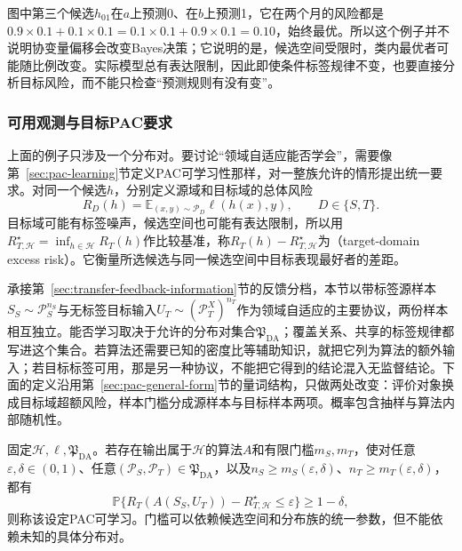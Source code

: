 图中第三个候选$h_{01}$在$a$上预测0、在$b$上预测1，它在两个月的风险都是$0.9\times0.1+0.1\times0.1=0.1\times0.1+0.9\times0.1=0.10$，始终最优。所以这个例子并不说明协变量偏移会改变Bayes决策；它说明的是，候选空间受限时，类内最优者可能随比例改变。实际模型总有表达限制，因此即使条件标签规律不变，也要直接分析目标风险，而不能只检查“预测规则有没有变”。

\subsubsection{可用观测与目标PAC要求}
\label{sec:transfer-pac-setting}

上面的例子只涉及一个分布对。要讨论“领域自适应能否学会”，需要像第~\ref{sec:pac-learning}节定义PAC可学习性那样，对一整族允许的情形提出统一要求。对同一个候选$h$，分别定义源域和目标域的总体风险
\begin{equation}
 R_D(h)=\mathbb E_{(x,y)\sim\mathcal P_D}\ell(h(x),y),
 \qquad D\in\{S,T\}.
 \label{eq:transfer-population-risks}
\end{equation}
目标域可能有标签噪声，候选空间也可能有表达限制，所以用$R_{T,\mathcal H}^{\star}=\inf_{h\in\mathcal H}R_T(h)$作比较基准，称$R_T(h)-R_{T,\mathcal H}^{\star}$为（target-domain excess risk）。它衡量所选候选与同一候选空间中目标表现最好者的差距。

承接第~\ref{sec:transfer-feedback-information}节的反馈分档，本节以带标签源样本$S_S\sim\mathcal P_S^{n_S}$与无标签目标输入$U_T\sim(\mathcal P_T^X)^{n_T}$作为领域自适应的主要协议，两份样本相互独立。能否学习取决于允许的分布对集合$\mathfrak P_{\mathrm{DA}}$；覆盖关系、共享的标签规律都写进这个集合。若算法还需要已知的密度比等辅助知识，就把它列为算法的额外输入；若目标标签可用，那是另一种协议，不能把它得到的结论混入无监督结论。下面的定义沿用第~\ref{sec:pac-general-form}节的量词结构，只做两处改变：评价对象换成目标域超额风险，样本门槛分成源样本与目标样本两项。概率包含抽样与算法内部随机性。

\begin{definition}[领域自适应的PAC可学习性]
\label{def:adaptation-pac-learnability}
固定$\mathcal H,\ell,\mathfrak P_{\mathrm{DA}}$。若存在输出属于$\mathcal H$的算法$A$和有限门槛$m_S,m_T$，使对任意$\varepsilon,\delta\in(0,1)$、任意$(\mathcal P_S,\mathcal P_T)\in\mathfrak P_{\mathrm{DA}}$，以及$n_S\geq m_S(\varepsilon,\delta)$、$n_T\geq m_T(\varepsilon,\delta)$，都有
\[
 \mathbb P\{R_T(A(S_S,U_T))-R_{T,\mathcal H}^{\star}\leq\varepsilon\}
 \geq1-\delta,
\]
则称该设定PAC可学习。门槛可以依赖候选空间和分布族的统一参数，但不能依赖未知的具体分布对。
\end{definition}

